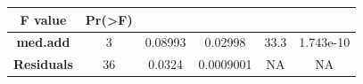 \documentclass[]{article}
\begin{document}
\begin{longtable}[]{@{}cccccc@{}}
\begin{minipage}[b]{0.12\columnwidth}\centering\strut
F value
\strut\end{minipage} &
\begin{minipage}[b]{0.12\columnwidth}\centering\strut
Pr(\textgreater{}F)
\strut\end{minipage}\tabularnewline
\midrule
\endhead
\begin{minipage}[t]{0.19\columnwidth}\centering\strut
\textbf{med.add}
\strut\end{minipage} &
\begin{minipage}[t]{0.06\columnwidth}\centering\strut
3
\strut\end{minipage} &
\begin{minipage}[t]{0.10\columnwidth}\centering\strut
0.08993
\strut\end{minipage} &
\begin{minipage}[t]{0.12\columnwidth}\centering\strut
0.02998
\strut\end{minipage} &
\begin{minipage}[t]{0.12\columnwidth}\centering\strut
33.3
\strut\end{minipage} &
\begin{minipage}[t]{0.12\columnwidth}\centering\strut
1.743e-10
\strut\end{minipage}\tabularnewline
\begin{minipage}[t]{0.19\columnwidth}\centering\strut
\textbf{Residuals}
\strut\end{minipage} &
\begin{minipage}[t]{0.06\columnwidth}\centering\strut
36
\strut\end{minipage} &
\begin{minipage}[t]{0.10\columnwidth}\centering\strut
0.0324
\strut\end{minipage} &
\begin{minipage}[t]{0.12\columnwidth}\centering\strut
0.0009001
\strut\end{minipage} &
\begin{minipage}[t]{0.12\columnwidth}\centering\strut
NA
\strut\end{minipage} &
\begin{minipage}[t]{0.12\columnwidth}\centering\strut
NA
\strut\end{minipage}\tabularnewline
\bottomrule
\end{longtable}
\end{document}

